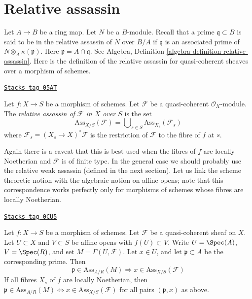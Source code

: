 \section{Relative assassin}
\label{divisors-section-relative-assassin}
Let $A \to B$ be a ring map. Let $N$ be a $B$-module. Recall that
a prime $\mathfrak q \subset B$ is said to be in the relative assassin
of $N$ over $B/A$ if $\mathfrak q$ is an associated prime of
$N \otimes_A \kappa(\mathfrak p)$. Here $\mathfrak p = A \cap \mathfrak q$.
See Algebra, Definition \ref{algebra-definition-relative-assassin}.
Here is the definition of the relative assassin for quasi-coherent
sheaves over a morphism of schemes.

\begin{definition}
\label{divisors-definition-relative-assassin}
\href{https://stacks.math.columbia.edu/tag/05AT}{\texttt{Stacks tag 05AT}}

Let $f : X \to S$ be a morphism of schemes.
Let $\mathcal{F}$ be a quasi-coherent $\mathcal{O}_X$-module.
The {\it relative assassin of $\mathcal{F}$ in $X$ over $S$}
is the set
$$
\text{Ass}_{X/S}(\mathcal{F}) =
\bigcup\nolimits_{s \in S} \text{Ass}_{X_s}(\mathcal{F}_s)
$$
where $\mathcal{F}_s = (X_s \to X)^*\mathcal{F}$ is the restriction
of $\mathcal{F}$ to the fibre of $f$ at $s$.
\end{definition}

Again there is a caveat that this is best used when the fibres of $f$
are locally Noetherian and $\mathcal{F}$ is of finite type. In the general
case we should probably use the relative weak assassin (defined in the next
section). Let us link the scheme theoretic notion with the algebraic notion
on affine opens; note that this correspondence works perfectly only
for morphisms of schemes whose fibres are locally Noetherian.

\begin{lemma}
\label{divisors-lemma-relative-assassin-affine-open}
\href{https://stacks.math.columbia.edu/tag/0CU5}{\texttt{Stacks tag 0CU5}}

Let $f : X \to S$ be a morphism of schemes.
Let $\mathcal{F}$ be a quasi-coherent sheaf on $X$.
Let $U \subset X$ and $V \subset S$ be affine opens
with $f(U) \subset V$. Write $U = \Spec(A)$, $V = \Spec(R)$, and set
$M = \Gamma(U, \mathcal{F})$.
Let $x \in U$, and let $\mathfrak p \subset A$ be the corresponding prime.
Then
$$
\mathfrak p \in \text{Ass}_{A/R}(M) \Rightarrow
x \in \text{Ass}_{X/S}(\mathcal{F})
$$
If all fibres $X_s$ of $f$ are locally Noetherian, then
$\mathfrak p \in \text{Ass}_{A/R}(M) \Leftrightarrow
x \in \text{Ass}_{X/S}(\mathcal{F})$
for all pairs $(\mathfrak p, x)$ as above.
\end{lemma}

